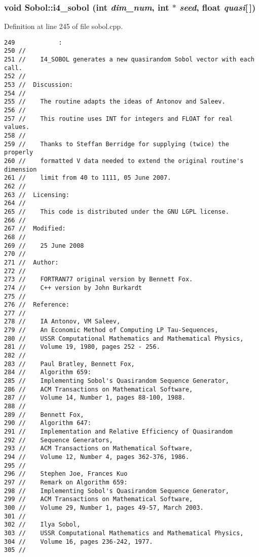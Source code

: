 \subsubsection{\setlength{\rightskip}{0pt plus 5cm}void Sobol::i4\_\-sobol (int {\em dim\_\-num}, int $\ast$ {\em seed}, float {\em quasi}[$\,$])}\label{namespaceSobol_b1e7bc3da10b02bd10b2ea4a7f1b3125}




Definition at line 245 of file sobol.cpp.

\begin{Code}\begin{verbatim}249            :
250 //
251 //    I4_SOBOL generates a new quasirandom Sobol vector with each call.
252 //
253 //  Discussion:
254 //
255 //    The routine adapts the ideas of Antonov and Saleev.
256 //
257 //    This routine uses INT for integers and FLOAT for real values.
258 //
259 //    Thanks to Steffan Berridge for supplying (twice) the properly
260 //    formatted V data needed to extend the original routine's dimension
261 //    limit from 40 to 1111, 05 June 2007.
262 //
263 //  Licensing:
264 //
265 //    This code is distributed under the GNU LGPL license. 
266 //
267 //  Modified:
268 //
269 //    25 June 2008
270 //
271 //  Author:
272 //
273 //    FORTRAN77 original version by Bennett Fox.
274 //    C++ version by John Burkardt
275 //
276 //  Reference:
277 //
278 //    IA Antonov, VM Saleev,
279 //    An Economic Method of Computing LP Tau-Sequences,
280 //    USSR Computational Mathematics and Mathematical Physics,
281 //    Volume 19, 1980, pages 252 - 256.
282 //
283 //    Paul Bratley, Bennett Fox,
284 //    Algorithm 659:
285 //    Implementing Sobol's Quasirandom Sequence Generator,
286 //    ACM Transactions on Mathematical Software,
287 //    Volume 14, Number 1, pages 88-100, 1988.
288 //
289 //    Bennett Fox,
290 //    Algorithm 647:
291 //    Implementation and Relative Efficiency of Quasirandom 
292 //    Sequence Generators,
293 //    ACM Transactions on Mathematical Software,
294 //    Volume 12, Number 4, pages 362-376, 1986.
295 //
296 //    Stephen Joe, Frances Kuo
297 //    Remark on Algorithm 659:
298 //    Implementing Sobol's Quasirandom Sequence Generator,
299 //    ACM Transactions on Mathematical Software,
300 //    Volume 29, Number 1, pages 49-57, March 2003.
301 //
302 //    Ilya Sobol,
303 //    USSR Computational Mathematics and Mathematical Physics,
304 //    Volume 16, pages 236-242, 1977.
305 //

\end{verbatim}
\end{Code}
